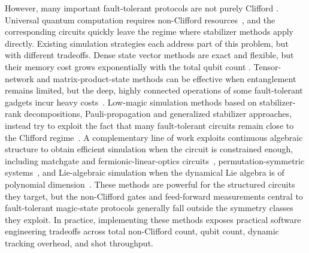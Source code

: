 \documentclass[a4paper, onecolumn, unpublished]{quantumarticle}
\begin{document}
    However, many important fault-tolerant protocols are not purely Clifford \cite{gidneyMagicStateCultivation2024,itogawaEfficientMagicState2025, chamberlandVeryLowOverhead2020, litinskiMagicStateDistillation2019}. Universal quantum computation requires non-Clifford resources~\cite{Bravyi2005Universal,howardContextualitySuppliesMagic2014}, and the corresponding circuits quickly leave the regime where stabilizer methods apply directly. Existing simulation strategies each address part of this problem, but with different tradeoffs. Dense state vector methods are exact and flexible, but their memory cost grows exponentially with the total qubit count \cite{qiskit2024, quantum_ai_team_and_collaborators_2025_4067237}. Tensor-network and matrix-product-state methods can be effective when entanglement remains limited, but the deep, highly connected operations of some fault-tolerant gadgets incur heavy costs~\cite{aryalDensityMatrixRenormalizationGroup2023, huangClassicalSimulationQuantum2020, markov2008simulating, Schuch2008}. Low-magic simulation methods based on stabilizer-rank decompositions, Pauli-propagation and generalized stabilizer approaches, instead try to exploit the fact that many fault-tolerant circuits remain close to the Clifford regime~\cite{bravyiImprovedClassicalSimulation2016, rallSimulationQubitQuantum2019, kissingerClassicalSimulationQuantum2022, sutcliffeFastClassicalSimulation2025, haenelTsimFastUniversal2026, surtiEfficientSimulationLogical2025}. A complementary line of work exploits continuous algebraic structure to obtain efficient simulation when the circuit is constrained enough, including matchgate and fermionic-linear-optics circuits~\cite{knillFermionicLinearOptics2001}, permutation-symmetric systems~\cite{anschuetzEfficientClassicalAlgorithms2023}, and Lie-algebraic simulation when the dynamical Lie algebra is of polynomial dimension~\cite{gohLieAlgebraicClassical2025, barligea2026enablingliealgebraicclassicalsimulation}. These methods are powerful for the structured circuits they target, but the non-Clifford gates and feed-forward measurements central to fault-tolerant magic-state protocols generally fall outside the symmetry classes they exploit. In practice, implementing these methods exposes practical software engineering tradeoffs across total non-Clifford count, qubit count, dynamic tracking overhead, and shot throughput.
\end{document}
